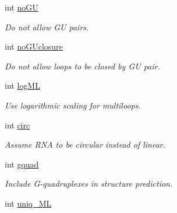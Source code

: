 \begin{DoxyCompactItemize}
\mbox{\label{group__model__details_ad64a5eaf9c4550e7525b36a725fec4b2}} 
int \hyperlink{group__model__details_ad64a5eaf9c4550e7525b36a725fec4b2}{no\+GU}
\begin{DoxyCompactList}\small\item\em Do not allow GU pairs. \end{DoxyCompactList}\item 
\mbox{\label{group__model__details_a7e883db1f33f8f3baa5c9b140350c78e}} 
int \hyperlink{group__model__details_a7e883db1f33f8f3baa5c9b140350c78e}{no\+G\+Uclosure}
\begin{DoxyCompactList}\small\item\em Do not allow loops to be closed by GU pair. \end{DoxyCompactList}\item 
\mbox{\label{group__model__details_ae259f89a94acae0c7f1412603e7f57b5}} 
int \hyperlink{group__model__details_ae259f89a94acae0c7f1412603e7f57b5}{log\+ML}
\begin{DoxyCompactList}\small\item\em Use logarithmic scaling for multiloops. \end{DoxyCompactList}\item 
\mbox{\label{group__model__details_a92762e1008503d4623ff5c01e358a464}} 
int \hyperlink{group__model__details_a92762e1008503d4623ff5c01e358a464}{circ}
\begin{DoxyCompactList}\small\item\em Assume R\+NA to be circular instead of linear. \end{DoxyCompactList}\item 
\mbox{\label{group__model__details_af88a511a2b1f526b4c6213de6cb8fd6e}} 
int \hyperlink{group__model__details_af88a511a2b1f526b4c6213de6cb8fd6e}{gquad}
\begin{DoxyCompactList}\small\item\em Include G-\/quadruplexes in structure prediction. \end{DoxyCompactList}\item 
\mbox{\label{group__model__details_ade065b814a4e2e72ead93ab502613ed2}} 
int \hyperlink{group__model__details_ade065b814a4e2e72ead93ab502613ed2}{uniq\+\_\+\+ML}

\end{DoxyCompactItemize}
